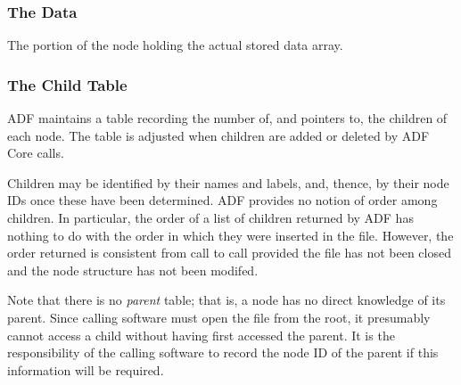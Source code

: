 \subsubsection{The Data}

The portion of the node holding the actual stored data array.

\subsubsection{The Child Table}

ADF maintains a table recording the number of, and pointers to, the
children of each node. The table is adjusted when children are added or
deleted by ADF Core calls.

Children may be identified by their names and labels, and, thence,
by their node IDs once these have been determined. ADF provides no
notion of order among children. In particular, the order of a list of
children returned by ADF has nothing to do with the order in which they
were inserted in the file. However, the order returned is consistent
from call to call provided the file has not been closed and the node
structure has not been modifed.

Note that there is no \emph{parent} table; that is, a node has no direct
knowledge of its parent. Since calling software must open the file
from the root, it presumably cannot access a child without having
first accessed the parent.  It is the responsibility of the calling
software to record the node ID of the parent if this information will be
required.
